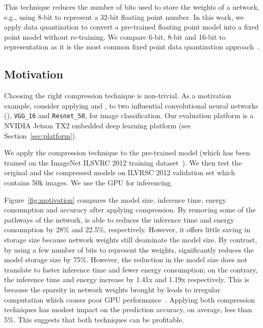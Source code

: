  This technique reduces the number of bits used to store the weights of a network, e.g., using 8-bit to
represent a 32-bit floating point number. In this work, we apply data quantization to convert a pre-trained floating point model into a
fixed point model without re-training. We compare 6-bit, 8-bit and 16-bit to representation as it is the most common fixed point data quantization
approach~\FIXME{\cite{}}.



\subsection{Motivation}
Choosing the right compression technique is non-trivial. As a motivation example, consider applying \pruning and \dquantization, to two
influential convolutional neural networks (\CNN), \texttt{VGG\_16} 	and \texttt{Resnet\_50}, for image classification. Our evaluation
platform is a NVIDIA Jetson TX2 embedded deep learning platform (see Section~\ref{sec:platform}).

 We apply the compression technique to the pre-trained model (which has been trained on the ImageNet ILSVRC 2012
training dataset~\cite{imagenet2012}). We then test the original and the compressed models on ILVRSC 2012 validation set which contains 50k
images. We use the GPU for inferencing.

 Figure~\ref{fig:motivation} compares the model size, inference time, energy consumption and accuracy after
applying compression. By removing some of the pathways of the network, \pruning is able to reduces the inference time and energy
consumption by 28\% and 22.5\%, respectively. However, it offers little saving in storage size because network weights still deaminate the
model size. By contrast, by using a few number of bits to represent the weights, \quantization significantly reduces the model storage size
by 75\%. However, the reduction in the model size does not translate to faster inference time and fewer energy consumption; on the
contrary, the inference time and energy increase by 1.41x and 1.19x respectively.
This is because the sparsity in network weights brought by \quantization leads to irregular computation which causes poor GPU
performance~\cite{DBLP:journals/corr/abs-1802-10280}. Applying both compression techniques has modest impact on the prediction accuracy, on
average, less than 5\%. This suggests that both techniques can be profitable.

